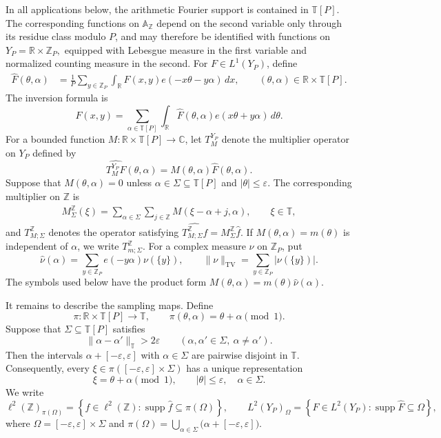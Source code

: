 \documentclass[12pt,reqno]{amsart}
\numberwithin{equation}{section}
\theoremstyle{definition}
\theoremstyle{remark}
\begin{document}
In all applications below, the arithmetic Fourier support is contained
in \(\mathbb T[P]\).  The corresponding functions on
\(\mathbb A_{\mathbb Z}\) depend on the second variable only through
its residue class modulo \(P\), and may therefore be identified with
functions on $Y_P=\mathbb R\times\mathbb Z_P,$
equipped with Lebesgue measure in the first variable and normalized
counting measure in the second.
For \(F\in L^1(Y_P)\), define
\begin{align}\label{e:FourierYP}
 \widehat F(\theta,\alpha)
 &=
 \frac1P\sum_{y\in\mathbb Z_P}
 \int_{\mathbb R}
 F(x,y)e(-x\theta-y\alpha)\,dx,
 \qquad
 (\theta,\alpha)\in\mathbb R\times\mathbb T[P].
\end{align}
The inversion formula is
\[
 F(x,y)
 =
 \sum_{\alpha\in\mathbb T[P]}
 \int_{\mathbb R}
 \widehat F(\theta,\alpha)e(x\theta+y\alpha)\,d\theta.
\]
For a bounded function
\(M:\mathbb R\times\mathbb T[P]\to\mathbb C\), let \(T_M^{Y_P}\)
denote the multiplier operator on \(Y_P\) defined by
\[
 \widehat{T_M^{Y_P}F}(\theta,\alpha)
 =
 M(\theta,\alpha)\widehat F(\theta,\alpha).
\]
Suppose that \(M(\theta,\alpha)=0\) unless
\(\alpha\in\Sigma\subseteq\mathbb T[P]\) and
\(|\theta|\leq\varepsilon\).  The corresponding multiplier on
\(\mathbb Z\) is
\begin{align}\label{e:IWlatticemultiplier}
 M_{\Sigma}^{\mathbb Z}(\xi)
 =
 \sum_{\alpha\in\Sigma}\sum_{j\in\mathbb Z}
 M(\xi-\alpha+j,\alpha),
 \qquad \xi\in\mathbb T,
\end{align}
and \(T_{M;\Sigma}^{\mathbb Z}\) denotes the operator satisfying $ \widehat{T_{M;\Sigma}^{\mathbb Z}f}
 =
 M_{\Sigma}^{\mathbb Z}\widehat f.$
If \(M(\theta,\alpha)=m(\theta)\) is independent of \(\alpha\), we
write \(T_{m;\Sigma}^{\mathbb Z}\).
For a complex measure \(\nu\) on \(\mathbb Z_P\), put
\[
 \widehat\nu(\alpha)
 =
 \sum_{y\in\mathbb Z_P}e(-y\alpha)\nu(\{y\}),
 \qquad
 \|\nu\|_{\mathrm{TV}}
 =
 \sum_{y\in\mathbb Z_P}|\nu(\{y\})|.
\]
The symbols used below have the product form $M(\theta,\alpha)=m(\theta)\widehat\nu(\alpha).$

It remains to describe the sampling maps.  Define
\[
 \pi:\mathbb R\times\mathbb T[P]\longrightarrow\mathbb T,
 \qquad
 \pi(\theta,\alpha)=\theta+\alpha\pmod1.
\]
Suppose that \(\Sigma\subseteq\mathbb T[P]\) satisfies
\[
 \|\alpha-\alpha'\|_{\mathbb T}>2\varepsilon
 \qquad
 (\alpha,\alpha'\in\Sigma,\ \alpha\neq\alpha').
\]
Then the intervals $ \alpha+[-\varepsilon,\varepsilon]$ with $\alpha\in\Sigma$
are pairwise disjoint in \(\mathbb T\).  Consequently, every
\(\xi\in\pi([-\varepsilon,\varepsilon]\times\Sigma)\) has a unique
representation
\[
 \xi=\theta+\alpha\pmod1,
 \qquad
 |\theta|\leq\varepsilon,\quad \alpha\in\Sigma.
\]
We write
\[
 \ell^2(\mathbb Z)_{\pi(\Omega)}
 =
 \left\{f\in\ell^2(\mathbb Z):
 \operatorname{supp}\widehat f\subseteq\pi(\Omega)\right\},
 \qquad
 L^2(Y_P)_\Omega
 =
 \left\{F\in L^2(Y_P):
 \operatorname{supp}\widehat F\subseteq\Omega\right\},
\]
where $\Omega=[-\varepsilon,\varepsilon]\times\Sigma$ and $\pi(\Omega)=
 \bigcup_{\alpha\in\Sigma}
 \bigl(\alpha+[-\varepsilon,\varepsilon]\bigr).$
\end{document}
